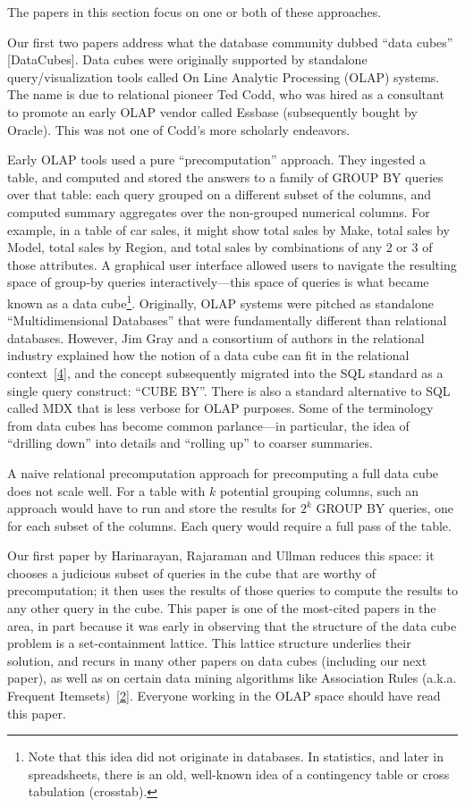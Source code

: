 \documentclass[b5paper,11pt,twoside,openright]{book}
\begin{document}
The papers in this section focus on one or both of these approaches.

Our first two papers address what the database community dubbed ``data
cubes'' {[}DataCubes{]}. Data cubes were originally supported by
standalone query/visualization tools called On Line Analytic Processing
(OLAP) systems. The name is due to relational pioneer Ted Codd, who was
hired as a consultant to promote an early OLAP vendor called Essbase
(subsequently bought by Oracle). This was not one of Codd's more
scholarly endeavors.

Early OLAP tools used a pure ``precomputation'' approach. They ingested
a table, and computed and stored the answers to a family of GROUP BY
queries over that table: each query grouped on a different subset of the
columns, and computed summary aggregates over the non-grouped numerical
columns. For example, in a table of car sales, it might show total sales
by Make, total sales by Model, total sales by Region, and total sales by
combinations of any 2 or 3 of those attributes. A graphical user
interface allowed users to navigate the resulting space of group-by
queries interactively---this space of queries is what became known as a
data cube\footnote{Note that this idea did not originate in databases. In statistics, and
  later in spreadsheets, there is an old, well-known idea of a
  contingency table or cross tabulation
  (crosstab).}. Originally, OLAP
systems were pitched as standalone ``Multidimensional Databases'' that
were fundamentally different than relational databases. However, Jim
Gray and a consortium of authors in the relational industry explained
how the notion of a data cube can fit in the relational
context~{{[}\protect\hyperlink{ref-gray-cube}{4}{]}}, and the concept
subsequently migrated into the SQL standard as a single query construct:
``CUBE BY''. There is also a standard alternative to SQL called MDX that
is less verbose for OLAP purposes. Some of the terminology from data
cubes has become common parlance---in particular, the idea of ``drilling
down'' into details and ``rolling up'' to coarser summaries.

A naive relational precomputation approach for precomputing a full data
cube does not scale well. For a table with $k$ potential grouping columns,
such an approach would have to run and store the results for
$2^k$ GROUP BY queries, one for each subset of
the columns. Each query would require a full pass of the table.

Our first paper by Harinarayan, Rajaraman and Ullman reduces this space:
it chooses a judicious subset of queries in the cube that are worthy of
precomputation; it then uses the results of those queries to compute the
results to any other query in the cube. This paper is one of the
most-cited papers in the area, in part because it was early in observing
that the structure of the data cube problem is a set-containment
lattice. This lattice structure underlies their solution, and recurs in
many other papers on data cubes (including our next paper), as well as
on certain data mining algorithms like Association Rules (a.k.a.
Frequent Itemsets)~{{[}\protect\hyperlink{ref-associationrules}{2}{]}}.
Everyone working in the OLAP space should have read this paper.
\end{document}

